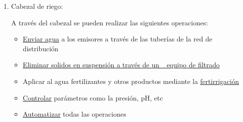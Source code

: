 \documentclass[a4paper,12pt,oneside]{article}
\begin{document}
\begin{enumerate}
\item Cabezal de riego:
\label{sec:org76c0c3e}

A través del cabezal se pueden realizar las siguientes operaciones:\\
\begin{itemize}
\item \uline{Enviar agua} a los emisores a través de las tuberías de la red de
distribución
\item \uline{Eliminar solidos en suspensión a través de un \_equipo de filtrado}
\item Aplicar al agua fertilizantes y otros productos mediante la \uline{fertirrigación}
\item \uline{Controlar} parámetros como la presión, pH, etc
\item \uline{Automatizar} todas las operaciones
\end{itemize}


\end{enumerate}
\end{document}
